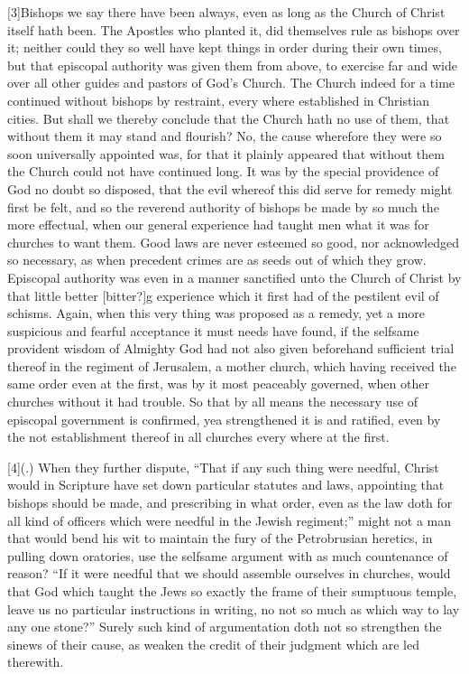[3]Bishops we say there have been always, even as long as the Church of Christ itself hath been. The Apostles who planted it, did themselves rule as bishops over it; neither could they so well have kept things in order during their own times, but that episcopal authority was given them from  above,
 to exercise far and wide over all other guides and pastors of God’s Church. The Church indeed for a time continued without bishops by restraint, every where established in Christian cities. But shall we thereby conclude that the Church hath no use of them, that without them it may stand and flourish? No, the cause wherefore they were so soon universally appointed was, for that it plainly appeared that without them the Church could not have continued long. It was by the special providence of God no doubt so disposed, that the evil whereof this did serve for remedy might first be felt, and so the reverend authority of bishops be made by so much the more effectual, when our general experience had taught men what it was for churches to want them. Good laws are never esteemed so good, nor acknowledged so necessary, as when precedent crimes are as seeds out of which they grow. Episcopal authority was even in a manner sanctified unto the Church of Christ by that little better [bitter?]g experience which it first had of the pestilent evil of schisms. Again, when this very thing was proposed as a remedy, yet a more suspicious and fearful acceptance it must needs have found, if the selfsame provident wisdom of Almighty God had not also given beforehand sufficient trial thereof in the regiment of Jerusalem, a mother church, which having received the same order even at the first, was by it most peaceably governed, when other churches without it had trouble. So that by all means the necessary use of episcopal government is confirmed, yea strengthened it is and ratified, even by the not establishment thereof in all churches every where at the first.

[4](.) When they further dispute, “That if any such thing were needful, Christ would in Scripture have set down particular statutes and laws, appointing that bishops should be made, and prescribing in what order, even as the law doth for all kind of officers which were needful in the Jewish regiment;” might not a man that would bend his wit to maintain the fury of the Petrobrusian heretics, in  pulling down oratories, use the selfsame argument with as much countenance of reason? “If it were needful that we should assemble ourselves in churches, would that God which taught the Jews so exactly the frame of their sumptuous temple, leave us no particular instructions in writing, no not so much as which way to lay any one stone?” Surely such kind of argumentation doth not so strengthen the sinews of their cause, as weaken the credit of their judgment which are led therewith.

